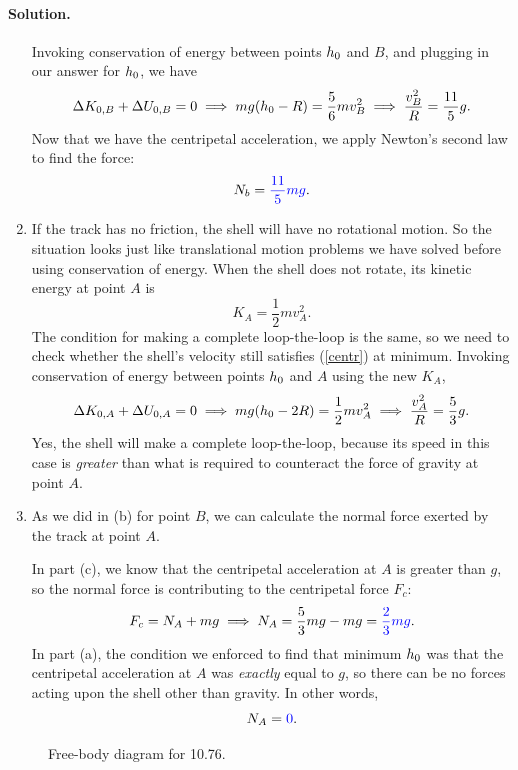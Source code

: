 \documentclass[11pt]{article}
\newcommand{\refeq}[1]{(\ref{#1})}
\newcommand{\beq}{\begin{equation*}}
\newcommand{\eeq}{\end{equation*}}
\newenvironment{solution}
{
    \paragraph{Solution.}
    \ignorespaces
}
{
    \bigskip
}
\begin{document}
\begin{solution}
\begin{enumerate}
		Invoking conservation of energy between points $h_0$ and $B$, and plugging in our answer for $h_0$, we have
			\beq
				\Delta K_{0,B} + \Delta U_{0,B} = 0 \implies mg (\ho - R) = \frac{5}{6} m v_B^2 \implies \frac{v_B^2}{R} = \frac{11}{5} g.
			\eeq
			Now that we have the centripetal acceleration, we apply Newton's second law to find the force:
			\beq
				N_b = {\color{blue} \frac{11}{5} m g}.
			\eeq
			
		\item If the track has no friction, the shell will have no rotational motion.  So the situation looks just like translational motion problems we have solved before using conservation of energy.  When the shell does not rotate, its kinetic energy at point $A$ is
			\beq
				K_A = \frac{1}{2} m v_A^2.
			\eeq
			The condition for making a complete loop-the-loop is the same, so we need to check whether the shell's velocity still satisfies \refeq{centr} at minimum.  Invoking conservation of energy between points $h_0$ and $A$ using the new $K_A$,
			\beq
				\Delta K_{0,A} + \Delta U_{0,A} = 0 \implies mg (\ho - 2R) = \frac{1}{2} m v_A^2 \implies \frac{v_A^2}{R} = \frac{5}{3} g.
			\eeq
			{\color{blue} Yes, the shell will make a complete loop-the-loop, because its speed in this case is \emph{greater} than what is required to counteract the force of gravity at point $A$.}
			
		\item As we did in (b) for point $B$, we can calculate the normal force exerted by the track at point $A$.
			
			In part (c), we know that the centripetal acceleration at $A$ is greater than $g$, so the normal force is contributing to the centripetal force $F_c$:
			\beq
				F_c = N_A + m g \implies N_A = \frac{5}{3} m g - m g = {\color{blue} \frac{2}{3} m g}.
			\eeq
			In part (a), the condition we enforced to find that minimum $h_0$ was that the centripetal acceleration at $A$ was \emph{exactly} equal to $g$, so there can be no forces acting upon the shell other than gravity.  In other words,
			\beq
				N_A = {\color{blue} 0}.
			\eeq
	\end{enumerate}
\end{solution}


\clearpage
\begin{figure}[b]
	\vspace{1.5in}
	\caption{Free-body diagram for 10.76.}
	\label{P10.76}
\end{figure}
\end{document}
